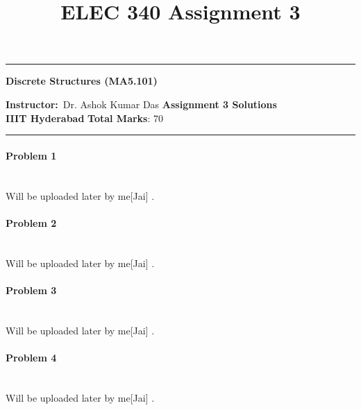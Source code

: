 \documentclass[12pt]{scrartcl}
\title{ELEC 340 Assignment 3}
\begin{document}
\begin{center}
\specialrule{0.02em}{}{}
\hrule
\vspace{0.3cm}
	{\textbf { \large {Discrete Structures (MA5.101) }}} 
\end{center}
\textbf{Instructor:}\ Dr. Ashok Kumar Das \hspace{\fill}\textbf{Assignment 3 Solutions}    \\
{\textbf{IIIT Hyderabad}   } \hspace{\fill} \textbf{Total Marks}: 70 \\ 
\specialrule{0.01em}{}{}
\hrule

\paragraph*{Problem 1 } 

\\ Will be uploaded later by me[Jai] .

\paragraph*{Problem 2 }

\\ Will be uploaded later by me[Jai] .

\paragraph*{Problem 3 }
\\ Will be uploaded later by me[Jai] .

\paragraph*{Problem 4}
\\ Will be uploaded later by me[Jai] .
\end{document}

